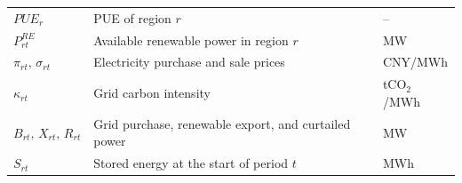 \begin{table}[H]
\begin{tabularx}{0.96\textwidth}{
			>{\centering\arraybackslash}p{}
			>{\raggedright\arraybackslash}X
			>{\centering\arraybackslash}p{}}
		$PUE_r$
        & PUE of region $r$
		& -- \\
		
		$P^{RE}_{rt}$
        & Available renewable power in region $r$
		& MW \\
		
		$\pi_{rt},\,\sigma_{rt}$
        & Electricity purchase and sale prices
        & CNY/MWh \\
		
		$\kappa_{rt}$
        & Grid carbon intensity
		& tCO$_2$/MWh \\
		
		$B_{rt},\,X_{rt},\,R_{rt}$
        & Grid purchase, renewable export, and curtailed power
		& MW \\
		
		$S_{rt}$
        & Stored energy at the start of period $t$
		& MWh \\
		
		\bottomrule
	\end{tabularx}
\end{table}
